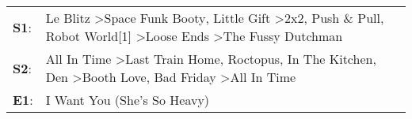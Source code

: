 \begin{supertabular}{p{0.03\textwidth}p{0.92\textwidth}}
 \textbf{S1}:  &  Le Blitz\textsuperscript{} \textgreater \enspace Space Funk Booty\textsuperscript{}, \enspace Little Gift\textsuperscript{} \textgreater \enspace 2x2\textsuperscript{}, \enspace Push \& Pull\textsuperscript{}, \enspace Robot World[1]\textsuperscript{} \textgreater \enspace Loose Ends\textsuperscript{} \textgreater \enspace The Fussy Dutchman\textsuperscript{}  \enspace  \\
 \textbf{S2}:  &                        All In Time\textsuperscript{} \textgreater \enspace Last Train Home\textsuperscript{}, \enspace Roctopus\textsuperscript{}, \enspace In The Kitchen\textsuperscript{}, \enspace Den\textsuperscript{} \textgreater \enspace Booth Love\textsuperscript{}, \enspace Bad Friday\textsuperscript{} \textgreater \enspace All In Time\textsuperscript{}  \enspace  \\
 \textbf{E1}:  &                                                                                                                                                                                                                                                                                                                              I Want You (She's So Heavy)\textsuperscript{}  \enspace  \\
\end{supertabular}
